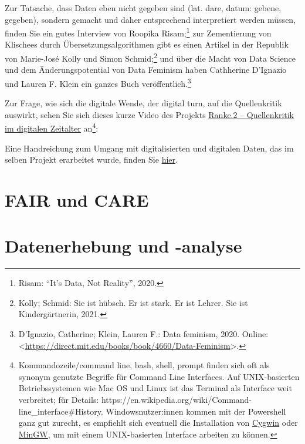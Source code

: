 \documentclass[
  letterpaper,
]{book}
\begin{document}
Zur Tatsache, dass Daten eben nicht gegeben sind (lat. dare, datum:
gebene, gegeben), sondern gemacht und daher entsprechend interpretiert
werden müssen, finden Sie ein gutes Interview von Roopika
Risam;\footnote{Risam: {``}{It}{'}s {Data}, {Not} {Reality}{''}, 2020.}
zur Zementierung von Klischees durch Übersetzungsalgorithmen gibt es
einen Artikel in der Republik von Marie-José Kolly und Simon
Schmid;\footnote{Kolly; Schmid: Sie ist h{ü}bsch. {Er} ist stark. {Er}
  ist {Lehrer}. {Sie} ist {Kinderg{ä}rtnerin}, 2021.} und über die Macht
von Data Science und dem Änderungspotential von Data Feminism haben
Cathherine D'Ignazio und Lauren F. Klein ein ganzes Buch
veröffentlich.\footnote{D'Ignazio, Catherine; Klein, Lauren F.: Data
  feminism, 2020. Online:
  \textless{}\url{https://direct.mit.edu/books/book/4660/Data-Feminism}\textgreater.}

Zur Frage, wie sich die digitale Wende, der digital turn, auf die
Quellenkritik auswirkt, sehen Sie sich dieses kurze Video des Projekts
\href{https://ranke2.uni.lu}{Ranke.2 -- Quellenkritik im digitalen
Zeitalter} an\footnote{Kommandozeile/command line, bash, shell, prompt
  finden sich oft als synonym genutzte Begriffe für Command Line
  Interfaces. Auf UNIX-basierten Betriebssystemen wie Mac OS und Linux
  ist das Terminal als Interface weit verbreitet; für Details:
  https://en.wikipedia.org/wiki/Command-line\_interface\#History.
  Windowsnutzer:innen kommen mit der Powershell ganz gut zurecht, es
  empfiehlt sich eventuell die Installation von
  \href{https://en.wikipedia.org/wiki/Cygwin}{Cygwin} oder
  \href{https://en.wikipedia.org/wiki/MinGW}{MinGW}, um mit einem
  UNIX-basierten Interface arbeiten zu können.}:

Eine Handreichung zum Umgang mit digitalisierten und digitalen Daten,
das im selben Projekt erarbeitet wurde, finden Sie
\href{documents/Ranke_visual-aid.pdf}{hier}.


\hypertarget{fair-und-care}{%
\chapter{FAIR und CARE}\label{fair-und-care}}


\hypertarget{datenerhebung-und--analyse}{%
\chapter{Datenerhebung und -analyse}\label{datenerhebung-und--analyse}}
\end{document}
